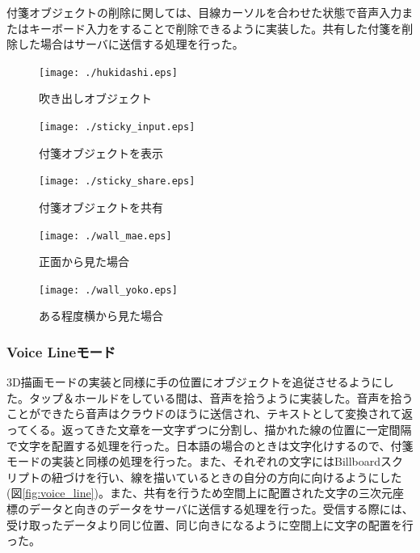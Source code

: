 \documentclass[11pt,a4j, titlepage]{jarticle} %
\begin{document}
付箋オブジェクトの削除に関しては、目線カーソルを合わせた状態で音声入力またはキーボード入力をすることで削除できるように実装した。共有した付箋を削除した場合はサーバに送信する処理を行った。

\begin{figure}[H]
  \begin{center}
    \texttt{[image: ./hukidashi.eps]}
    \caption{吹き出しオブジェクト}
    \label{fig:hukidashi}
  \end{center}
\end{figure}

\begin{figure}[H]
  \begin{center}
    \texttt{[image: ./sticky\_input.eps]}
    \caption{付箋オブジェクトを表示}
    \label{fig:sticky_input}
  \end{center}
\end{figure}

\begin{figure}[H]
  \begin{center}
    \texttt{[image: ./sticky\_share.eps]}
    \caption{付箋オブジェクトを共有}
    \label{fig:sticky_share}
  \end{center}
\end{figure}

\begin{figure}[H]
  \begin{center}
    \texttt{[image: ./wall\_mae.eps]}
    \caption{正面から見た場合}
    \label{fig:wall_mae}
  \end{center}
\end{figure}

\begin{figure}[H]
  \begin{center}
    \texttt{[image: ./wall\_yoko.eps]}
    \caption{ある程度横から見た場合}
    \label{fig:wall_yoko}
  \end{center}
\end{figure}

\subsubsection{Voice Lineモード}
3D描画モードの実装と同様に手の位置にオブジェクトを追従させるようにした。タップ＆ホールドをしている間は、音声を拾うように実装した。音声を拾うことができたら音声はクラウドのほうに送信され、テキストとして変換されて返ってくる。返ってきた文章を一文字ずつに分割し、描かれた線の位置に一定間隔で文字を配置する処理を行った。日本語の場合のときは文字化けするので、付箋モードの実装と同様の処理を行った。また、それぞれの文字にはBillboardスクリプトの紐づけを行い、線を描いているときの自分の方向に向けるようにした(図\ref{fig:voice_line})。また、共有を行うため空間上に配置された文字の三次元座標のデータと向きのデータをサーバに送信する処理を行った。受信する際には、受け取ったデータより同じ位置、同じ向きになるように空間上に文字の配置を行った。
\end{document}
